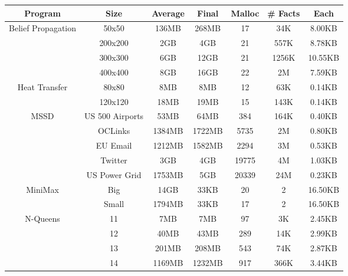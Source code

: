 \begin{tabular}{c | c || c | c | c || c c} \hline
	\textbf{Program} & \textbf{Size} & \textbf{Average} & \textbf{Final} & \textbf{Malloc} & \textbf{\# Facts} & \textbf{Each} \\ \hline \hline
	\multirow{4}{*}{Belief Propagation}  & 50x50 & 136MB & 268MB & 17 & 34K & 8.00KB \\
		 & 200x200 & 2GB & 4GB & 21 & 557K & 8.78KB \\
		 & 300x300 & 6GB & 12GB & 21 & 1256K & 10.55KB \\
		 & 400x400 & 8GB & 16GB & 22 & 2M & 7.59KB \\
	\hline
	\multirow{2}{*}{Heat Transfer}  & 80x80 & 8MB & 8MB & 12 & 63K & 0.14KB \\
		 & 120x120 & 18MB & 19MB & 15 & 143K & 0.14KB \\
	\hline
	\multirow{5}{*}{MSSD}  & US 500 Airports & 53MB & 64MB & 384 & 164K & 0.40KB \\
		 & OCLinks & 1384MB & 1722MB & 5735 & 2M & 0.80KB \\
		 & EU Email & 1212MB & 1582MB & 2294 & 3M & 0.53KB \\
		 & Twitter & 3GB & 4GB & 19775 & 4M & 1.03KB \\
		 & US Power Grid & 1753MB & 5GB & 20339 & 24M & 0.23KB \\
	\hline
	\multirow{2}{*}{MiniMax}  & Big & 14GB & 33KB & 20 & 2 & 16.50KB \\
		 & Small & 1794MB & 33KB & 17 & 2 & 16.50KB \\
	\hline
	\multirow{4}{*}{N-Queens}  & 11 & 7MB & 7MB & 97 & 3K & 2.45KB \\
		 & 12 & 40MB & 43MB & 289 & 14K & 2.99KB \\
		 & 13 & 201MB & 208MB & 543 & 74K & 2.87KB \\
		 & 14 & 1169MB & 1232MB & 917 & 366K & 3.44KB \\
	\hline
\end{tabular}
